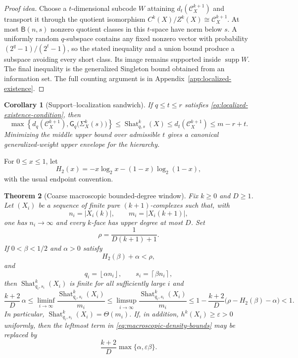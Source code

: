 \documentclass[11pt,letterpaper]{article}
\theoremstyle{plain}
\newtheorem{theorem}{Theorem}[section]
\newtheorem{corollary}[theorem]{Corollary}
\theoremstyle{definition}
\newcommand{\cC}{\mathcal{C}}
\newcommand{\supp}{\operatorname{supp}}
\newcommand{\Shat}{\operatorname{Shat}}
\newcommand{\1}{\mathbf{1}}
\newcommand{\abs}[1]{\left|#1\right|}
\newcommand{\ceil}[1]{\left\lceil#1\right\rceil}
\newcommand{\floor}[1]{\left\lfloor#1\right\rfloor}
\begin{document}
\begin{proof}[Proof idea]
Choose a $t$-dimensional subcode $W$ attaining $d_t(\cC_X^{k+1})$ and transport it
through the quotient isomorphism
$C^k(X)/Z^k(X)\cong\cC_X^{k+1}$.  At most $\mathsf B(n,s)$ nonzero quotient classes in
this $t$-space have norm below $s$.  A uniformly random $q$-subspace contains any fixed
nonzero vector with probability $(2^q-1)/(2^t-1)$, so the stated inequality and a union
bound produce a subspace avoiding every short class.  Its image remains supported inside
$\supp W$.  The final inequality is the generalized Singleton bound obtained from an
information set.  The full counting argument is in
Appendix~\ref{app:localized-existence}.
\end{proof}

\begin{corollary}[Support--localization sandwich]
\label{cor:support-localization-sandwich}
If $q\le t\le r$ satisfies \eqref{eq:localized-existence-condition}, then
\begin{equation}\label{eq:support-localization-sandwich}
 \max\left\{
 d_q(\cC_X^{k+1}),
 \mathsf G_q\bigl(\Sigma_X^k(s)\bigr)
 \right\}
 \le \Shat_{q,s}^k(X)
 \le d_t(\cC_X^{k+1})
 \le m-r+t.
\end{equation}
Minimizing the middle upper bound over admissible $t$ gives a canonical
generalized-weight upper envelope for the hierarchy.
\end{corollary}

For $0\le x\le1$, let
\[
 H_2(x)=-x\log_2x-(1-x)\log_2(1-x),
\]
with the usual endpoint convention.

\begin{theorem}[Coarse macroscopic bounded-degree window]
\label{thm:macroscopic-shattering}
Fix $k\ge0$ and $D\ge1$.  Let $(X_i)$ be a sequence of finite pure
$(k+1)$-complexes such that, with
\[
 n_i=\abs{X_i(k)},\qquad m_i=\abs{X_i(k+1)},
\]
one has $n_i\to\infty$ and every $k$-face has upper degree at most $D$.  Set
\[
 \rho=\frac{1}{D(k+1)+1}.
\]
If $0<\beta<1/2$ and $\alpha>0$ satisfy
\begin{equation}\label{eq:macroscopic-region}
 H_2(\beta)+\alpha<\rho,
\end{equation}
and
\[
 q_i=\floor{\alpha n_i},\qquad s_i=\ceil{\beta n_i},
\]
then $\Shat_{q_i,s_i}^k(X_i)$ is finite for all sufficiently large $i$ and
\begin{equation}\label{eq:macroscopic-density-bounds}
 \frac{k+2}{D}\,\alpha
 \le
 \liminf_{i\to\infty}\frac{\Shat_{q_i,s_i}^k(X_i)}{m_i}
 \le
 \limsup_{i\to\infty}\frac{\Shat_{q_i,s_i}^k(X_i)}{m_i}
 \le
 1-\frac{k+2}{D}\bigl(\rho-H_2(\beta)-\alpha\bigr)
 <1.
\end{equation}
In particular, $\Shat_{q_i,s_i}^k(X_i)=\Theta(m_i)$.  If, in addition,
$h^k(X_i)\ge\varepsilon>0$ uniformly, then the leftmost term in
\eqref{eq:macroscopic-density-bounds} may be replaced by
\begin{equation}\label{eq:macroscopic-expanded-lower}
 \frac{k+2}{D}\max\{\alpha,\varepsilon\beta\}.
\end{equation}
\end{theorem}
\end{document}
